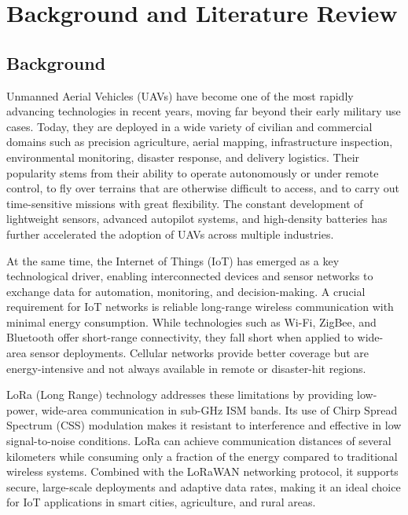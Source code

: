 \chapter{Background and Literature Review}

\pagestyle{fancy}

\section*{Background}

Unmanned Aerial Vehicles (UAVs) have become one of the most rapidly advancing technologies in recent years, moving far beyond their early military use cases. Today, they are deployed in a wide variety of civilian and commercial domains such as precision agriculture, aerial mapping, infrastructure inspection, environmental monitoring, disaster response, and delivery logistics. Their popularity stems from their ability to operate autonomously or under remote control, to fly over terrains that are otherwise difficult to access, and to carry out time-sensitive missions with great flexibility. The constant development of lightweight sensors, advanced autopilot systems, and high-density batteries has further accelerated the adoption of UAVs across multiple industries.

At the same time, the Internet of Things (IoT) has emerged as a key technological driver, enabling interconnected devices and sensor networks to exchange data for automation, monitoring, and decision-making. A crucial requirement for IoT networks is reliable long-range wireless communication with minimal energy consumption. While technologies such as Wi-Fi, ZigBee, and Bluetooth offer short-range connectivity, they fall short when applied to wide-area sensor deployments. Cellular networks provide better coverage but are energy-intensive and not always available in remote or disaster-hit regions.

LoRa (Long Range) technology addresses these limitations by providing low-power, wide-area communication in sub-GHz ISM bands. Its use of Chirp Spread Spectrum (CSS) modulation makes it resistant to interference and effective in low signal-to-noise conditions. LoRa can achieve communication distances of several kilometers while consuming only a fraction of the energy compared to traditional wireless systems. Combined with the LoRaWAN networking protocol, it supports secure, large-scale deployments and adaptive data rates, making it an ideal choice for IoT applications in smart cities, agriculture, and rural areas.

